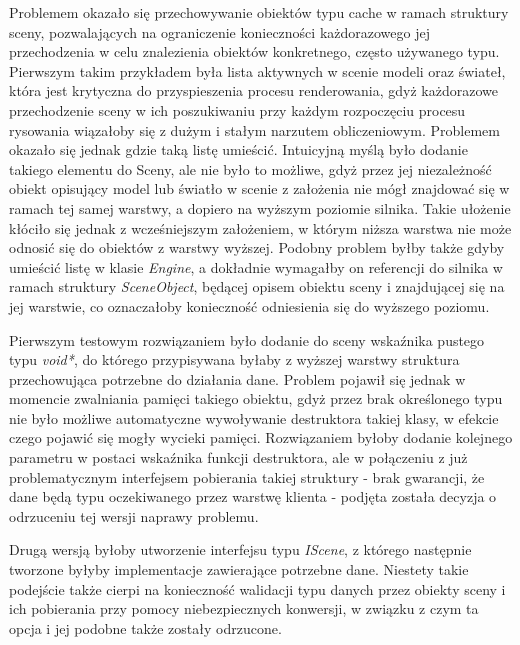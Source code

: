 Problemem okazało się przechowywanie obiektów typu cache w ramach struktury sceny, pozwalających na ograniczenie konieczności każdorazowego jej przechodzenia w celu znalezienia obiektów konkretnego, często używanego typu. Pierwszym takim przykładem była lista aktywnych w scenie modeli oraz świateł, która jest krytyczna do przyspieszenia procesu renderowania, gdyż każdorazowe przechodzenie sceny w ich poszukiwaniu przy każdym rozpoczęciu procesu rysowania wiązałoby się z dużym i stałym narzutem obliczeniowym. Problemem okazało się jednak gdzie taką listę umieścić. Intuicyjną myślą było dodanie takiego elementu do Sceny, ale nie było to możliwe, gdyż przez jej niezależność obiekt opisujący model lub światło w scenie z założenia nie mógł znajdować się w ramach tej samej warstwy, a dopiero na wyższym poziomie silnika. Takie ułożenie kłóciło się jednak z wcześniejszym założeniem, w którym niższa warstwa nie może odnosić się do obiektów z warstwy wyższej. Podobny problem byłby także gdyby umieścić listę w klasie \textit{Engine}, a dokładnie wymagałby on referencji do silnika w ramach struktury \textit{SceneObject}, będącej opisem obiektu sceny i znajdującej się na jej warstwie, co oznaczałoby konieczność odniesienia się do wyższego poziomu. 

Pierwszym testowym rozwiązaniem było dodanie do sceny wskaźnika pustego typu \textit{void*}, do którego przypisywana byłaby z wyższej warstwy struktura przechowująca potrzebne do działania dane. Problem pojawił się jednak w momencie zwalniania pamięci takiego obiektu, gdyż przez brak określonego typu nie było możliwe automatyczne wywoływanie destruktora takiej klasy, w efekcie czego pojawić się mogły wycieki pamięci. Rozwiązaniem byłoby dodanie kolejnego parametru w postaci wskaźnika funkcji destruktora, ale w połączeniu z już problematycznym interfejsem pobierania takiej struktury - brak gwarancji, że dane będą typu oczekiwanego przez warstwę klienta - podjęta została decyzja o odrzuceniu tej wersji naprawy problemu. 

Drugą wersją byłoby utworzenie interfejsu typu \textit{IScene}, z którego następnie tworzone byłyby implementacje zawierające potrzebne dane. Niestety takie podejście także cierpi na konieczność walidacji typu danych przez obiekty sceny i ich pobierania przy pomocy niebezpiecznych konwersji, w związku z czym ta opcja i jej podobne także zostały odrzucone. 

